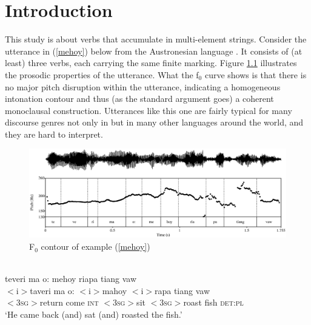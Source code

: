 \chapter{Introduction}
\label{ch:introduction}
This study is about verbs that accumulate in multi-element strings. Consider the utterance in (\ref{mehoy}) below from the Austronesian language . It consists of (at least) three verbs, each carrying the same finite marking. Figure \ref{fig:ex1_pitch} illustrates the prosodic properties of the utterance. What the f$_0$ curve shows is that there is no major pitch disruption within the utterance, indicating a homogeneous intonation contour and thus (as the standard argument goes) a coherent monoclausal construction. Utterances like this one are fairly typical for many discourse genres not only in  but in many other languages around the world, and they are hard to interpret.

\begin{figure}
\begin{center}
\includegraphics[width=1.0\textwidth]{figures/mehoy.eps} 
\caption{F$_0$ contour of example (\ref{mehoy})}\label{fig:ex1_pitch}
\end{center}
\end{figure}

\ea \label{mehoy}
\\
\glll teveri ma o: mehoy riapa tiang vaw\\
$<$i$>$taveri ma o: $<$i$>$mahoy $<$i$>$rapa tiang vaw\\
$<$3\textsc{sg}$>$return come \textsc{int} $<$3\textsc{sg}$>$sit $<$3\textsc{sg}$>$roast fish \textsc{det}:\textsc{pl}\\
\glt ‘He came back (and) sat (and) roasted the fish.’
\z


